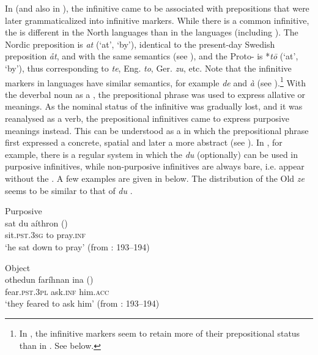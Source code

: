 \documentclass[output=paper]{langscibook}
\begin{document}
In  (and also in ), the infinitive came to be associated with prepositions that were later grammaticalized into infinitive markers. While there is a common  infinitive, the  is different in the North  languages than in the  languages (including ). The Nordic preposition is \textit{at} (‘at’, ‘by’), identical to the present-day Swedish preposition \textit{åt}, and with the same semantics (see \citealt{Hellquist1948}), and the Proto- is *\textit{tō} (‘at’, ‘by’), thus corresponding to  \textit{te}, Eng. \textit{to}, Ger. \textit{zu}, etc. Note that the infinitive markers in  languages have similar semantics, for example  \textit{de} and \textit{à} (see \citealt[15]{Beckman1934}).\footnote{In , the infinitive markers seem to retain more of their prepositional status than in . See  below.}  With the deverbal noun as a , the prepositional phrase was used to express allative or  meanings. As the nominal status of the infinitive was gradually lost, and it was reanalysed as a verb, the prepositional infinitives came to express purposive meanings instead. This can be understood as a  in which the prepositional phrase first expressed a concrete, spatial  and later a more abstract  (see \citealt{Los2005}). In , for example, there is a regular system in which the  \textit{du} (optionally) can be used in purposive infinitives, while non-purposive infinitives are always bare, i.e. appear without the . A few examples are given in  below. The distribution of the Old  \textit{ze} seems to be similar to that of  \textit{du} \citep{Haspelmath1989}. 

\ea
\label{ex:kalm:3}
\ea {}Purposive\\\label{ex:kalm:3a}
\gll sat du aíthron ()\\
sit.\textsc{pst.3sg} to pray.\textsc{inf}\\
\glt ‘he sat down to pray’ (from \citealt{Wright1954}: 193–194) 

\ex Object\\\label{ex:kalm:3b}
\gll othedun faríhnan ina ()\\
fear\textsc{.pst.3pl} ask.\textsc{inf} him.\textsc{acc}\\
\glt ‘they feared to ask him’ (from \citealt{Wright1954}: 193–194)
\end{document}

